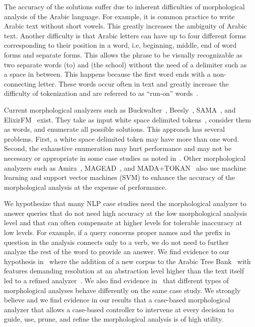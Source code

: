 \documentclass[11pt,letterpaper]{article}
\begin{document}
\novocalize
The accuracy of the solutions suffer due to inherent difficulties
of morphological analysis of the Arabic language. 
For example, it is common practice to write Arabic text
without short vowels. 
This greatly increases the ambiguity of Arabic text. 
Another difficulty is that  Arabic letters can have up to 
four different forms
corresponding to their position in a word, i.e, beginning,
middle, end of word forms and separate forms. 
This allows the phrase \transfalse
{} \transtrue
to be visually recognizable
as two separate words  (to) and  (the school) 
without the need of a delimiter such as a space in between. 
This happens because the first word  ends with
 a non-connecting letter. 
These words occur often in text and greatly increase the
difficulty of tokenization and are referred to as 
``run-on'' words~\cite{Buckwalter:04}.

Current morphological analyzers such as 
Buckwalter~,
Beesly~, SAMA~\cite{Kulick:10},
and ElixirFM~\cite{Otakar:07} exist.
They take as input white space delimited tokens~\cite{Kulick:10},
consider them as words,
and enumerate all possible solutions. 
This approach has several problems. 
First, 
a white space delimited token may have 
more than one word.
Second, the exhaustive enumeration may hurt performance and may
not be necessary or appropriate
in some case studies as noted in~\cite{Maamouri:10}. 
Other morphological analyzers such as Amira~\cite{Diab:07,Benajiba:07},
MAGEAD~\cite{Habash:05}, and MADA+TOKAN~\cite{Habash:09} 
also use machine learning and support vector machines (SVM) 
to enhance the accuracy of the morphological analysis at the expense 
of performance.

We hypothesize that many NLP case studies need the 
morphological analyzer to answer queries that do not need 
high accuracy at the low morphological analysis level 
and that can often compensate at higher levels for tolerable inaccuracy 
at low levels. 
For example, if a query concerns proper names and the 
prefix in question in the analysis connects only to a verb, 
we do not need to further analyze the rest of the word 
to provide an answer.
We find evidence to our hypothesis in~\cite{Maamouri:10} where the 
addition of a new corpus to the Arabic Tree Bank~\cite{Maamouri:04}
with features demanding resolution at an abstraction level
higher than the text itself
led to a refined analyzer~\cite{Kulick:10}.  
We also find evidence in~\cite{Habash:06} that different types of 
morphological analyses behave differently on the same case study. 
We strongly believe and we find evidence in our results that a 
case-based morphological analyzer that allows a case-based
controller to intervene at every decision to 
guide, use, prune, and refine the morphological analysis
is of high utility.
\end{document}
